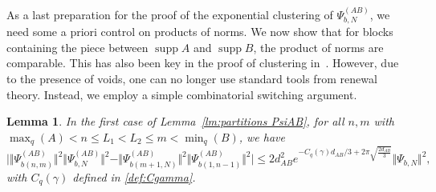\documentclass[letterpaper, DIV=17]{scrartcl}
\newtheorem{lemma}[theorem]{Lemma}
\numberwithin{equation}{section}
\theoremstyle{definition}
\DeclareMathOperator{\supp}{supp}
\begin{document}
As a last preparation for the proof of the exponential clustering of $\Psi_{b,N}^{(AB)}$, we need some a priori control on products of norms. 
We now show that for blocks containing the piece between $\supp A$ and $\supp B$, the product of norms are comparable. This has also been key in the proof of clustering in~\cite{jansen2009symmetry}. However, due to the presence of voids, one can no longer use standard tools from renewal theory. Instead, we employ a simple combinatorial switching argument. %
\begin{lemma}
	In the first case of Lemma~\ref{lm:partitions PsiAB}, for all $n,m$ with $\max_q (A)<n\leq L_1<L_2\leq m<\min_q(B)$, we have
	\begin{equation} \label{difference of products norms}
		\big\vert \Vert \Psi_{b(n,m)}^{(AB)} \Vert^2 \Vert \Psi_{b,N}^{(AB)}\Vert^2 - \Vert \Psi_{b(m+1,N)}^{(AB)} \Vert^2 \Vert \Psi_{b(1,n-1)}^{(AB)} \Vert^2 \big \vert
		\leq 2d_{AB}^2 e^{-C_q(\gamma)d_{AB}/3+2\pi \sqrt{\frac{2d_{AB}}{3}}} \Vert \Psi_{b, N}\Vert^2,
	\end{equation}
	with $C_q(\gamma)$ defined in \eqref{def:Cgamma}.
\end{lemma}
\end{document}
